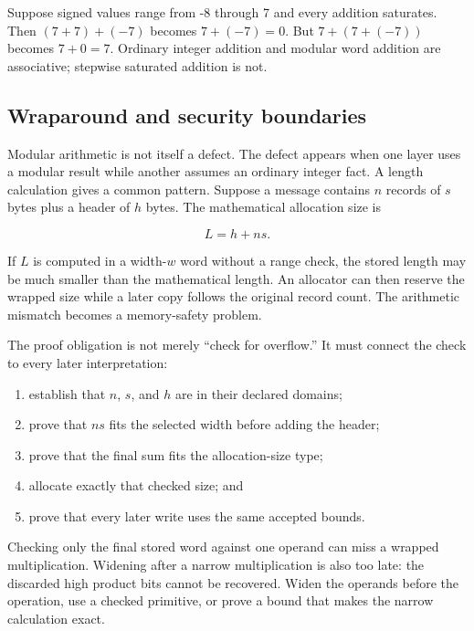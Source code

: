 \begin{example}[title={Reassociation fails under saturation}]
Suppose signed values range from -8 through 7 and every addition saturates.
Then \((7+7)+(-7)\) becomes \(7+(-7)=0\). But
\(7+(7+(-7))\) becomes \(7+0=7\). Ordinary integer addition and modular word
addition are associative; stepwise saturated addition is not.
\end{example}

\subsection{Wraparound and security boundaries}

Modular arithmetic is not itself a defect. The defect appears when one layer
uses a modular result while another assumes an ordinary integer fact. A length
calculation gives a common pattern. Suppose a message contains \(n\) records
of \(s\) bytes plus a header of \(h\) bytes. The mathematical allocation size
is

\[
  L=h+ns.
\]

If \(L\) is computed in a width-\(w\) word without a range check, the stored
length may be much smaller than the mathematical length. An allocator can then
reserve the wrapped size while a later copy follows the original record count.
The arithmetic mismatch becomes a memory-safety problem.

The proof obligation is not merely ``check for overflow.'' It must connect the
check to every later interpretation:

\begin{enumerate}
\item establish that \(n\), \(s\), and \(h\) are in their declared domains;
\item prove that \(ns\) fits the selected width before adding the header;
\item prove that the final sum fits the allocation-size type;
\item allocate exactly that checked size; and
\item prove that every later write uses the same accepted bounds.
\end{enumerate}

Checking only the final stored word against one operand can miss a wrapped
multiplication. Widening after a narrow multiplication is also too late: the
discarded high product bits cannot be recovered. Widen the operands before the
operation, use a checked primitive, or prove a bound that makes the narrow
calculation exact.

